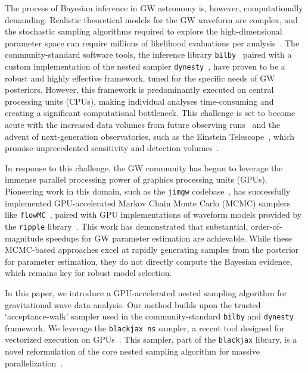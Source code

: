 \documentclass[fleqn,usenatbib]{mnras}
\begin{document}
The process of Bayesian inference in GW astronomy is, however, computationally
demanding. Realistic theoretical models for the GW waveform are complex, and the
stochastic sampling algorithms required to explore the high-dimensional parameter
space can require millions of likelihood evaluations per analysis~\citep{LIGO_guide_signalextraction}.
The community-standard software tools, the inference library \texttt{bilby}~\citep{bilby_paper}
paired with a custom implementation of the nested sampler \texttt{dynesty}~\citep{dynesty}, 
have proven to be a robust and highly effective framework, tuned for the specific needs of GW posteriors.
However, this framework is predominantly executed on central processing units
(CPUs), making individual analyses time-consuming and creating a significant
computational bottleneck. This challenge is set to become acute with the
increased data volumes from future observing runs~\citep{aLIGO, aVirgo, aLVK_prospects} and the advent of
next-generation observatories, such as the Einstein Telescope~\citep{ET_science_case}, which promise
unprecedented sensitivity and detection volumes~\citep{HuAccelerationReview}.

In response to this challenge, the GW community has begun to leverage the immense
parallel processing power of graphics processing units (GPUs). Pioneering work in
this domain, such as the \texttt{jimgw} codebase~\citep{wong2023fastgravitationalwaveparameter}, has successfully
implemented GPU-accelerated Markov Chain Monte Carlo (MCMC) samplers like \texttt{flowMC}~\citep{flowMC}, 
paired with GPU implementations of waveform models provided by the
\texttt{ripple} library~\citep{ripple}. This work has demonstrated that
substantial, order-of-magnitude speedups for GW parameter estimation are
achievable. While these MCMC-based approaches excel at rapidly generating samples
from the posterior for parameter estimation, they do not directly compute the
Bayesian evidence, which remains key for robust model selection.

In this paper, we introduce a GPU-accelerated nested sampling
algorithm for gravitational wave data analysis. Our method
builds upon the trusted `acceptance-walk' sampler used in the
community-standard \texttt{bilby} and \texttt{dynesty} framework.
We leverage the \texttt{blackjax ns} sampler, a recent tool
designed for vectorized execution on GPUs~\citep{yallup2025nested}.
This sampler, part of the \texttt{blackjax} library, is a novel reformulation
of the core nested sampling algorithm for massive parallelization~\citep{cabezas2024blackjax}.
\end{document}
